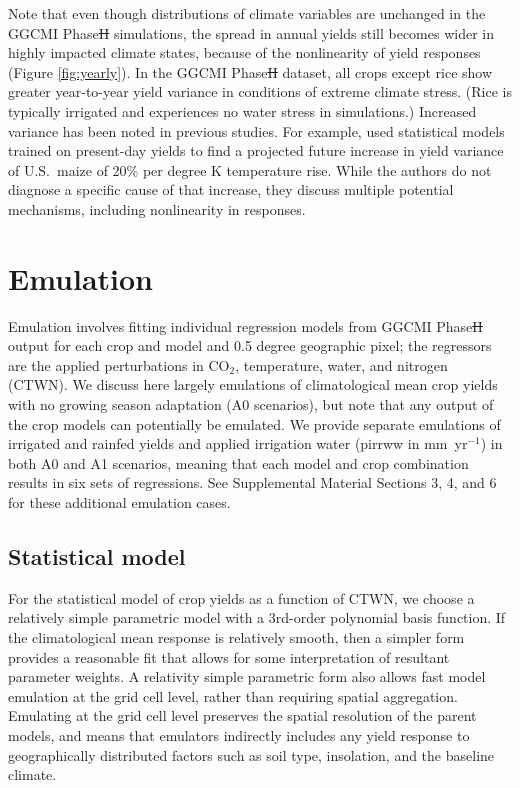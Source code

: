 \documentclass[gmdd]{copernicus} %
\providecommand{\DIFadd}[1]{{\protect\color{blue}\uwave{#1}}} %
\providecommand{\DIFdel}[1]{{\protect\color{red}\sout{#1}}}                      %
\providecommand{\DIFaddbegin}{} %
\providecommand{\DIFaddend}{} %
\providecommand{\DIFdelbegin}{} %
\providecommand{\DIFdelend}{} %
\begin{document}
Note that even though distributions of climate variables are unchanged in the GGCMI Phase\DIFdelbegin \DIFdel{II }\DIFdelend \DIFaddbegin \DIFadd{~2 }\DIFaddend simulations, the spread in annual yields still becomes wider in highly impacted climate states, because of the nonlinearity of yield responses (Figure \ref{fig:yearly}). 
In the GGCMI Phase\DIFdelbegin \DIFdel{II }\DIFdelend \DIFaddbegin \DIFadd{~2 }\DIFaddend dataset, all crops except rice show  greater year-to-year yield variance in conditions of extreme climate stress.
(Rice is typically irrigated and experiences no water stress in simulations.) 
Increased variance has been noted in previous studies. 
For example, \citet{Urban2012} used statistical models trained on present-day yields to find a projected future increase in yield variance of U.S.\ maize of 20\% per degree K temperature rise. While the authors do not diagnose a specific cause of that increase, they discuss multiple potential mechanisms, including nonlinearity in responses. 

\section{Emulation}
\label{S:3}
Emulation involves fitting individual regression models from GGCMI Phase\DIFdelbegin \DIFdel{II }\DIFdelend \DIFaddbegin \DIFadd{~2 }\DIFaddend output for each crop and model and 0.5 degree geographic pixel; the regressors are the applied perturbations in CO$_2$, temperature, water, and nitrogen (CTWN). 
We discuss here largely emulations of climatological mean crop yields with no growing season adaptation (A0 scenarios), but note that any output of the crop models can potentially be emulated. 
We provide separate emulations of irrigated and rainfed yields and applied irrigation water (pirrww in mm\ yr$^{-1}$) in both A0 and A1 scenarios, meaning that each model and crop combination results in six sets of regressions. See Supplemental Material Sections 3, 4, and 6 for these additional emulation cases.

\subsection{Statistical model}
For the statistical model of crop yields as a function of CTWN, we choose a relatively simple parametric model with a 3rd-order polynomial basis function. 
If the climatological mean response is relatively smooth, then a simpler form provides a reasonable fit that allows for some interpretation of resultant parameter weights. 
A relativity simple parametric form also allows fast model emulation at the grid cell level, rather than requiring spatial aggregation. 
Emulating at the grid cell level preserves the spatial resolution of the parent models, and means that emulators indirectly includes any yield response to geographically distributed factors such as soil type, insolation, and the baseline climate.
\end{document}
